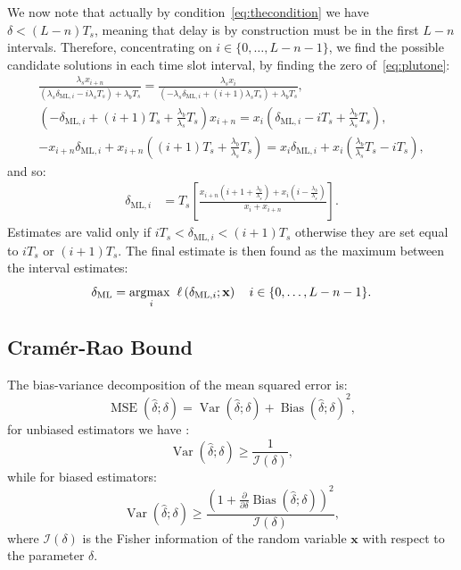 \noindent
We now note that actually by condition~\eqref{eq:thecondition} we have \(\delta<(L-n)T_s\), meaning that delay is by construction must be in the first \(L-n\) intervals. Therefore, concentrating on \(i\in\{0, \ldots, L-n-1\}\), we find the possible candidate solutions in each time slot interval, by finding the zero of~\eqref{eq:plutone}:
\begin{gather}
\frac{\lambda_s x_{i+n}}{\left(\lambda_s \delta_{\mathrm{ML}, i}-i \lambda_s T_s\right)+\lambda_b T_s}
=\frac{\lambda_s x_i}{\left(-\lambda_s \delta_{\mathrm{ML}, i}+(i+1) \lambda_s T_s\right)+\lambda_b T_s},\\
\left(-\delta_{\mathrm{ML}, i}+(i+1) T_s+\frac{\lambda_b}{\lambda_s} T_s\right) x_{i+n}
=x_i\left(\delta_{\mathrm{ML}, i}-i T_s+\frac{\lambda_b}{\lambda_s} T_s\right),\\
- x_{i+n}\delta_{\mathrm{ML}, i}+x_{i+n}\left((i+1) T_s+\frac{\lambda_b}{\lambda_s} T_s\right)
=x_i \delta_{\mathrm{ML}, i}+x_i\left(\frac{\lambda_b}{\lambda_s} T_s-i T_s\right),
\end{gather}
and so:
\begin{equation}
\begin{aligned}
\delta_{\mathrm{ML}, i}
&=T_s\left[\frac{x_{i+n}\left(i+1 +\frac{\lambda_b}{\lambda_s} \right)+x_i\left(i -\frac{\lambda_b}{\lambda_s} \right)}{x_i+x_{i+n}}\right].
\end{aligned} 
\label{eq:estimator}
\end{equation}
Estimates are valid only if \(iT_s<\delta_{\mathrm{ML}, i}<(i+1)T_s\) otherwise they are set equal to \(iT_s\) or \((i+1)T_s\). The final estimate is then found as the maximum between the interval estimates:
\begin{equation}
\delta_{\mathrm{ML}}=\underset{i}{\operatorname*{argmax\;}} \; \ell\left(\delta_{\mathrm{ML}, i} ; \mathbf{x}\right) \quad i\in\{0, \ldots, L-n-1\}.
\label{eq:afterestimator}
\end{equation}

\subsection{Cramér-Rao Bound}
The bias-variance decomposition of the mean squared error is:
\begin{equation}
\operatorname{MSE}(\hat{\delta};\delta)=\operatorname{Var}(\hat{\delta};\delta)+\operatorname{Bias}(\hat{\delta};\delta)^2 ,
\end{equation}
for unbiased estimators we have :
\begin{equation}
\operatorname{Var}(\hat{\delta};\delta) \geq \frac{1}{\mathcal{I}(\delta)},
\end{equation}
while for biased estimators:
\begin{equation}
\operatorname{Var}(\hat{\delta};\delta) \geq \frac{(1+\frac{\partial}{\partial \delta}\operatorname{Bias}(\hat{\delta};\delta))^2}{\mathcal{I}(\delta)},
\end{equation}
where \(\mathcal{I}(\delta)\) is the Fisher information of the random variable \(\mathbf{x}\) with respect to the parameter \(\delta\).

